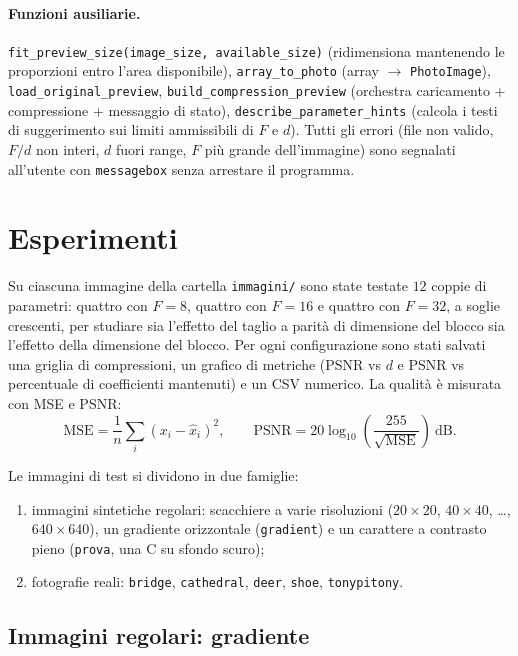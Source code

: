 \documentclass[11pt,a4paper]{article}
\begin{document}
\paragraph{Funzioni ausiliarie.}
\texttt{fit\_preview\_size(image\_size, available\_size)} (ridimensiona
mantenendo le proporzioni entro l'area disponibile),
\texttt{array\_to\_photo} (array $\to$ \texttt{PhotoImage}),
\texttt{load\_original\_preview}, \texttt{build\_compression\_preview}
(orchestra caricamento + compressione + messaggio di stato),
\texttt{describe\_parameter\_hints} (calcola i testi di suggerimento sui limiti
ammissibili di $F$ e $d$). Tutti gli errori (file non valido, $F/d$ non interi,
$d$ fuori range, $F$ più grande dell'immagine) sono segnalati all'utente con
\texttt{messagebox} senza arrestare il programma.

\section{Esperimenti}\label{sec:esperimenti}

Su ciascuna immagine della cartella \texttt{immagini/} sono state testate
$12$ coppie di parametri: quattro con $F=8$, quattro con $F=16$ e quattro con
$F=32$, a soglie crescenti, per studiare sia l'effetto del taglio a parità di
dimensione del blocco sia l'effetto della dimensione del blocco. Per ogni
configurazione sono stati salvati una griglia di compressioni, un grafico di
metriche (PSNR vs $d$ e PSNR vs percentuale di coefficienti mantenuti) e un
CSV numerico. La qualità è misurata con MSE e PSNR:
\[
\mathrm{MSE} = \frac{1}{n}\sum_i (x_i - \hat x_i)^2, \qquad
\mathrm{PSNR} = 20\log_{10}\!\left(\frac{255}{\sqrt{\mathrm{MSE}}}\right)\ \text{dB}.
\]

Le immagini di test si dividono in due famiglie:
\begin{enumerate}
  \item immagini sintetiche regolari: scacchiere a varie risoluzioni
        ($20\times20$, $40\times40$, \dots, $640\times640$), un gradiente
        orizzontale (\texttt{gradient}) e un carattere a contrasto pieno
        (\texttt{prova}, una \guillemotleft C\guillemotright{} su sfondo scuro);
  \item fotografie reali: \texttt{bridge}, \texttt{cathedral}, \texttt{deer},
        \texttt{shoe}, \texttt{tonypitony}.
\end{enumerate}

\subsection{Immagini regolari: gradiente}
\end{document}
